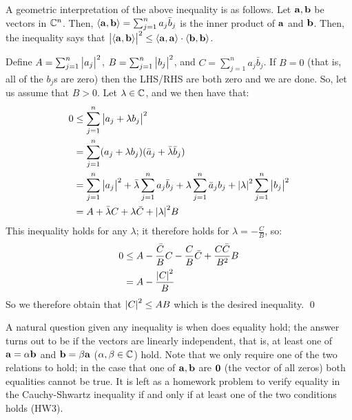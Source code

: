 A geometric interpretation of the above inequality is as follows. Let $\mathbf{a}, \mathbf{b}$ be vectors in $\mathbb{C}^n$. Then, $\left< \mathbf{a}, \mathbf{b} \right> = \sum_{j=1}^na_j\bar{b}_j$ is the inner product of $\mathbf{a}$ and $\mathbf{b}$. Then, the inequality says that $\abs{\left< \mathbf{a}, \mathbf{b} \right>}^2 \leq \left< \mathbf{a}, \mathbf{a} \right>\cdot\left< \mathbf{b}, \mathbf{b} \right>$. 
\begin{nproof}
    Define $A = \sum_{j=1}^n\abs{a_j}^2$, $B = \sum_{j=1}^n\abs{b_j}^2$, and $C = \sum_{j=1}^na_j\bar{b}_j$. If $B = 0$ (that is, all of the $b_j$s are zero) then the LHS/RHS are both zero and we are done. So, let us assume that $B > 0$. Let $\lambda \in \mathbb{C}$, and we then have that:
    \begin{align*}
        0 &\leq \sum_{j=1}^n\abs{a_j + \lambda b_j}^2 \\ &= \sum_{j=1}^n(a_j + \lambda b_j)(\bar{a}_j + \bar{\lambda}\bar{b}_j)
        \\ &= \sum_{j=1}^n\abs{a_j}^2 + \bar{\lambda}\sum_{j=1}^na_j\bar{b}_j + \lambda\sum_{j=1}^n\bar{a}_jb_j + \abs{\lambda}^2\sum_{j=1}^n\abs{b_j}^2
        \\ &= A + \bar{\lambda}C + \lambda\bar{C} + \abs{\lambda}^2B
    \end{align*}
    This inequality holds for any $\lambda$; it therefore holds for $\lambda = -\frac{C}{B}$, so:
    \begin{align*}
        0 &\leq A - \frac{\bar{C}}{B}C - \frac{C}{B}\bar{C} + \frac{C\bar{C}}{B^2}B
        \\ &= A - \frac{\abs{C}^2}{B}
    \end{align*}
    So we therefore obtain that $\abs{C}^2 \leq AB$ which is the desired inequality. \qed
\end{nproof}
\noindent A natural question given any inequality is when does equality hold; the answer turns out to be if the vectors are linearly independent, that is, at least one of $\mathbf{a} = \alpha \mathbf{b}$ and $\mathbf{b} = \beta \mathbf{a}$ ($\alpha, \beta \in \mathbb{C}$) hold. Note that we only require one of the two relations to hold; in the case that one of $\mathbf{a}, \mathbf{b}$ are $\mathbf{0}$ (the vector of all zeros) both equalities cannot be true. It is left as a homework problem to verify equality in the Cauchy-Shwartz inequality if and only if at least one of the two conditions holds (HW3). 

